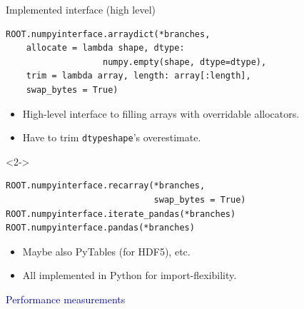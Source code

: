 \documentclass{beamer}
\begin{document}
\begin{frame}[fragile]{Implemented interface (high level)}
\vspace{0.5 cm}
\small
\begin{verbatim}
ROOT.numpyinterface.arraydict(*branches,
    allocate = lambda shape, dtype:
                   numpy.empty(shape, dtype=dtype),
    trim = lambda array, length: array[:length],
    swap_bytes = True)
\end{verbatim}
\normalsize
\begin{itemize}
\item High-level interface to filling arrays with overridable allocators.
\item Have to trim {\tt\small dtypeshape}'s overestimate.
\end{itemize}

\vspace{0.25 cm}
\begin{uncoverenv}<2->
\small
\begin{verbatim}
ROOT.numpyinterface.recarray(*branches,
                             swap_bytes = True)
ROOT.numpyinterface.iterate_pandas(*branches)
ROOT.numpyinterface.pandas(*branches)
\end{verbatim}
\normalsize
\begin{itemize}
\item Maybe also PyTables (for HDF5), etc.
\item All implemented in Python for import-flexibility.
\end{itemize}
\end{uncoverenv}
\end{frame}

\begin{frame}{}
\begin{center}
\LARGE \textcolor{darkblue}{Performance measurements}
\end{center}
\end{frame}
\end{document}
